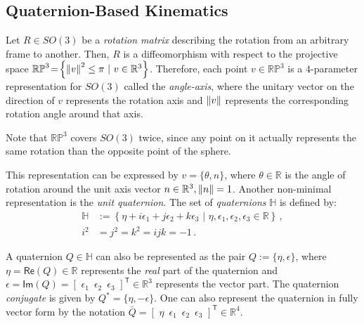 \subsection{Quaternion-Based Kinematics}

Let $R \in SO(3)$ be a \textit{rotation matrix} describing the rotation from an arbitrary frame to another.
%
Then, $R$ is a diffeomorphism with respect to the projective space $\mathbb{RP}^{3} \!=\! \left\{ \left\lVert v\right\rVert^2 \leq \pi \,\,|\,\, v \in \mathbb{R}^3 \right\}$.
Therefore, each point $v \in \mathbb{RP}^{3}$ is a $4$-parameter representation for $SO(3)$ called the \textit{angle-axis}, where the unitary vector on the direction of $v$ represents the rotation axis and $\left\lVert v\right\rVert$ represents the corresponding rotation angle around that axis.
%
\begin{remark}
Note that $\mathbb{RP}^{3}$ covers $SO(3)$ twice, since any point on it actually represents the same rotation than the opposite point of the sphere.
\end{remark}
%
This representation can be expressed by $v = \{\theta,n\}$, where $\theta \in \mathbb{R}$ is the angle of rotation around the unit axis vector $n \in \mathbb{R}^{3}, \left\lVert n\right\rVert = 1$.
%
Another non-minimal representation is the \textit{unit quaternion}. The set of \textit{quaternions} $\mathbb{H}$ is defined by:
%
\begin{align}
\mathbb{H} &:= \left\{ \eta + i \epsilon_{1} + j \epsilon_{2} + k \epsilon_{3} \,\,|\,\, \eta,\epsilon_{1},\epsilon_{2},\epsilon_{3} \in \mathbb{R} \right\} \,, \nonumber \\
i^2 &= j^2 = k^2 = ijk = -1 \,.
\label{eq:def_quaternion}
\end{align}

A quaternion $Q \in \mathbb{H}$ can also be represented as the pair $Q := \{\eta,\epsilon\}$, where 
$\eta = \mathsf{Re}(Q) \in \mathbb{R}$ represents the \textit{real} part of the quaternion and $\epsilon = \mathsf{Im}(Q) = [\,\, \epsilon_{1} \,\,\, \epsilon_{2} \,\,\, \epsilon_{3} \,\,]^\mathsf{T} \in \mathbb{R}^{3}$ represents the vector part.
%
The quaternion \textit{conjugate} is given by $Q^* = \{\eta,-\epsilon\}$.
%
One can also represent the quaternion in fully vector form by the notation 
$\bar{Q} = [\,\, \eta \,\,\, \epsilon_{1} \,\,\, \epsilon_{2} \,\,\, \epsilon_{3} \,\,]^\mathsf{T} \in \mathbb{R}^4$.

